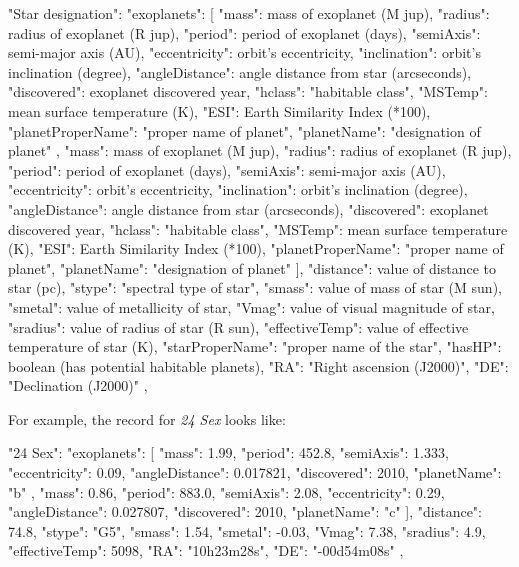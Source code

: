 \begin{configfile}
"Star designation":
{
	"exoplanets":
	[
	{
		"mass": mass of exoplanet (M jup),
		"radius": radius of exoplanet (R jup),
		"period": period of exoplanet (days),
		"semiAxis": semi-major axis (AU),
		"eccentricity": orbit's eccentricity,
		"inclination": orbit's inclination (degree),
		"angleDistance": angle distance from star 
		                 (arcseconds),
		"discovered": exoplanet discovered year,
		"hclass": "habitable class",
		"MSTemp": mean surface temperature (K),
		"ESI": Earth Similarity Index (*100),
		"planetProperName": "proper name of planet",
		"planetName": "designation of planet"
	},
	{
		"mass": mass of exoplanet (M jup),
		"radius": radius of exoplanet (R jup),
		"period": period of exoplanet (days),
		"semiAxis": semi-major axis (AU),
		"eccentricity": orbit's eccentricity,
		"inclination": orbit's inclination (degree),
		"angleDistance": angle distance from star 
		                 (arcseconds),
		"discovered": exoplanet discovered year,
		"hclass": "habitable class",
		"MSTemp": mean surface temperature (K),
		"ESI": Earth Similarity Index (*100),
		"planetProperName": "proper name of planet",
		"planetName": "designation of planet"
	}
	],
	"distance": value of distance to star (pc),
	"stype": "spectral type of star",
	"smass": value of mass of star (M sun),
	"smetal": value of metallicity of star,
	"Vmag": value of visual magnitude of star,
	"sradius": value of radius of star (R sun),
	"effectiveTemp": value of effective temperature 
	                 of star (K),
	"starProperName": "proper name of the star",
	"hasHP": boolean (has potential habitable planets),
	"RA": "Right ascension (J2000)",
	"DE": "Declination (J2000)"
},
\end{configfile}

\noindent For example, the record for \textit{24 Sex} looks like:
\begin{configfile}
"24 Sex":
{
		"exoplanets":
		[
		{
			"mass": 1.99,
			"period": 452.8,
			"semiAxis": 1.333,
			"eccentricity": 0.09,
			"angleDistance": 0.017821,
			"discovered": 2010,
			"planetName": "b"
		},
		{
			"mass": 0.86,
			"period": 883.0,
			"semiAxis": 2.08,
			"eccentricity": 0.29,
			"angleDistance": 0.027807,
			"discovered": 2010,
			"planetName": "c"
		}
		],
		"distance": 74.8,
		"stype": "G5",
		"smass": 1.54,
		"smetal": -0.03,
		"Vmag": 7.38,
		"sradius": 4.9,
		"effectiveTemp": 5098,
		"RA": "10h23m28s",
		"DE": "-00d54m08s"
},
\end{configfile}


